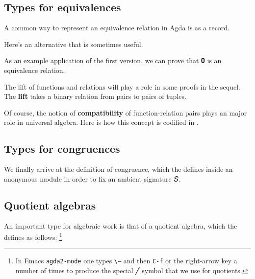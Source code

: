 \documentclass[a4paper,USenglish,cleveref,autoref,thm-restate]{lipics-v2019}
\begin{document}
\subsection{Types for equivalences}\label{types-for-equivalences}
A common way to represent an equivalence relation in Agda is as a record.
\begin{code}\end{code}
Here's an alternative that is sometimes useful.
\begin{code}\end{code}
As an example application of the first version, we can prove that 𝟎 is an equivalence relation.
\begin{code}\end{code}

The lift of functions and relations will play a role in some proofs in the sequel. The \textbf{lift} takes a binary relation from pairs to pairs of tuples.
\begin{code}\end{code}
Of course, the notion of \textbf{compatibility} of function-relation pairs plays an major role in universal algebra. Here is how this concept is codified in \agdaualib.
\begin{code}\end{code}

\subsection{Types for congruences}\label{types-for-congruences}
We finally arrive at the definition of congruence, which the \agdaualib defines inside an anonymous module in order to fix an ambient signature \ab 𝑆.
\begin{code}\end{code}

\subsection{Quotient algebras}
An important type for algebraic work is that of a quotient algebra, which the \agdaualib defines as follows:%
\footnote{In Emacs \texttt{agda2-mode} one types \texttt{\textbackslash ---} and then \texttt{C-f} or the right-arrow key a number of times to produce the special ╱ symbol that we use for quotients.}
\begin{code}\end{code}
\end{document}

